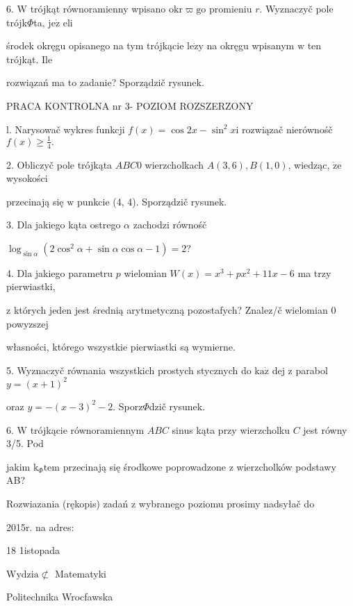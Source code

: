 \documentclass[a4paper,12pt]{article}
\begin{document}
6. $\mathrm{W}$ trójkąt równoramienny wpisano $\mathrm{o}\mathrm{k}\mathrm{r}\varpi \mathrm{g}\mathrm{o}$ promieniu $r$. Wyznaczyč pole trójk$\Phi$ta, $\mathrm{j}\mathrm{e}\dot{\mathrm{z}}$ eli

środek okręgu opisanego na tym trójkącie $\mathrm{l}\mathrm{e}\dot{\mathrm{z}}\mathrm{y}$ na okręgu wpisanym $\mathrm{w}$ ten trójkąt. Ile

rozwiązań ma to zadanie? Sporządzič rysunek.




PRACA KONTROLNA nr 3- POZIOM ROZSZERZONY

l. Narysowač wykres funkcji $f(x)=\cos 2x-\sin^{2}x \mathrm{i}$ rozwiązač nierównośč $f(x)\displaystyle \geq\frac{1}{4}.$

2. Obliczyč pole trójkąta $ABC 0$ wierzcholkach $A(3,6), B(1,0)$, wiedząc, $\dot{\mathrm{z}}\mathrm{e}$ wysokości

przecinają się $\mathrm{w}$ punkcie (4, 4). Sporządzič rysunek.

3. Dla jakiego kąta ostrego $\alpha$ zachodzi równośč

$\log_{\sin\alpha}(2\cos^{2}\alpha+\sin\alpha\cos\alpha-1)=2$?

4. Dla jakiego parametru $p$ wielomian $W(x) = x^{3}+px^{2}+11x-6$ ma trzy pierwiastki,

$\mathrm{z}$ których jeden jest średnią arytmetyczną pozostafych? Znalez/č wielomian $0$ powyzszej

własności, którego wszystkie pierwiastki są wymierne.

5. Wyznaczyč równania wszystkich prostych stycznych do $\mathrm{k}\mathrm{a}\dot{\mathrm{z}}$ dej $\mathrm{z}$ parabol $y=(x+1)^{2}$

oraz $y=-(x-3)^{2}-2$. Sporz$\Phi$dzič rysunek.

6. $\mathrm{W}$ trójkącie równoramiennym $ABC$ sinus kąta przy wierzcholku $C$ jest równy 3/5. Pod

jakim $\mathrm{k}_{\Phi}\mathrm{t}\mathrm{e}\mathrm{m}$ przecinają się środkowe poprowadzone $\mathrm{z}$ wierzcholków podstawy AB?

Rozwiazania (rękopis) zadań z wybranego poziomu prosimy nadsyłač do

2015r. na adres:

18 1istopada

$\mathrm{W}\mathrm{y}\mathrm{d}\mathrm{z}\mathrm{i}\mathrm{a}\not\subset$ Matematyki

Politechnika Wrocfawska
\end{document}
